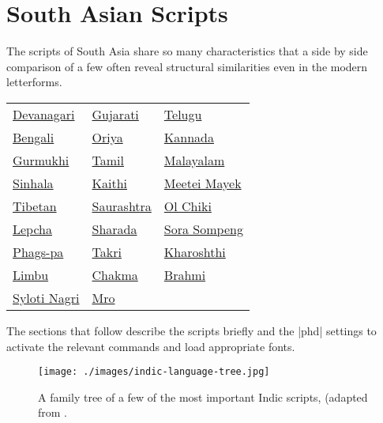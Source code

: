 \bgroup
\arial


\chapter{South Asian Scripts}

The scripts of South Asia share so many characteristics that a side by side comparison of a few often reveal structural similarities even in the 
modern letterforms.
\medskip


\begin{center}
\begin{tabular}{lll}
  \hyperref[s:devanagari]{Devanagari} 
& \hyperref[s:gujarati]{Gujarati}
& \hyperref[s:telugu]{Telugu}\\
  \hyperref[s:bengali]{Bengali}
& \hyperref[s:oriya]{Oriya} 
& \hyperref[s:kannada]{Kannada}\\
  \hyperref[s:gurmukhi]{Gurmukhi} 
& \hyperref[s:tamil]{Tamil}
& \hyperref[s:malayalam]{Malayalam}\\
  \hyperref[s:sinhala]{Sinhala} 
& \hyperref[s:kaithi]{Kaithi}  
& \hyperref[s:meeteimayek]{Meetei Mayek}\\
  \hyperref[s:tibetan]{Tibetan} 
& \hyperref[s:saurashtra]{Saurashtra} 
& \hyperref[olchiki]{Ol Chiki}\\
  \hyperref[s:lepcha]{Lepcha}
& \hyperref[s:sharada]{Sharada} 
& \hyperref[s:sorasompeng]{Sora Sompeng}\\
  \hyperref[s:phagspa]{Phags-pa} 
& \hyperref[s:takri]{Takri}  
& \hyperref[s:kharoshthi]{Kharoshthi}\\
  \hyperref[s:limbu]{Limbu} 
& \hyperref[s:chakma]{Chakma}
& \hyperref[s:brahmi]{Brahmi}\\
  \hyperref[s:sylotinagra]{Syloti Nagri} 
& \hyperref[s:mro]{Mro} 
&\\
\end{tabular}
\end{center}

The sections that follow describe the scripts briefly and the |phd| settings
to activate the relevant commands and load appropriate fonts. 

\begin{figure}[htbp]
\texttt{[image: ./images/indic-language-tree.jpg]}
\caption{A family tree of a few of the most important Indic scripts, (adapted from \protect\cite{writing}.}
\end{figure}



%




